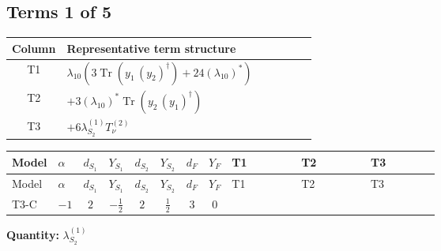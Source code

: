 \documentclass[8pt]{article}
\begin{document}
\begin{landscape}
\subsection*{Terms 1 of 5}
\begin{center}
\begin{tabular}{@{}c >{\raggedright\arraybackslash}p{0.82\linewidth}@{}}
\toprule
Column & Representative term structure \\
\midrule
T1 & \(\displaystyle {\lambda_{10}} (3 \operatorname{Tr}\!\left({y_1}\,\left({y_2}\right)^{\dagger}\right)+24 \left({\lambda_{10}}\right)^{*})\) \\
\midrule
T2 & \(\displaystyle +3 \left({\lambda_{10}}\right)^{*} \operatorname{Tr}\!\left({y_2}\,\left({y_1}\right)^{\dagger}\right)\) \\
\midrule
T3 & \(\displaystyle +6 {\lambda_{S_2}^{(1)}} T_{\nu}^{(2)}\) \\
\midrule
\bottomrule
\end{tabular}
\end{center}
\smallskip
\tiny
\begin{longtable}{@{}llcccccc >{\raggedright\arraybackslash}p{0.21\linewidth} >{\raggedright\arraybackslash}p{0.21\linewidth} >{\raggedright\arraybackslash}p{0.21\linewidth}@{}}
\toprule
Model & $\alpha$ & $d_{S_1}$ & $Y_{S_1}$ & $d_{S_2}$ & $Y_{S_2}$ & $d_F$ & $Y_F$ & T1 & T2 & T3 \\
\midrule
\endfirsthead
\toprule
Model & $\alpha$ & $d_{S_1}$ & $Y_{S_1}$ & $d_{S_2}$ & $Y_{S_2}$ & $d_F$ & $Y_F$ & T1 & T2 & T3 \\
\midrule
\endhead
T3-C & $-1$ & $2$ & $-\frac{1}{2}$ & $2$ & $\frac{1}{2}$ & $3$ & $0$ & \scriptsize\adjustbox{max width=\linewidth}{$\begin{gathered} {\lambda_{10}} (3 \operatorname{Tr}\!\left({y_1}\,\left({y_2}\right)^{\dagger}\right)+24 \left({\lambda_{10}}\right)^{*})\end{gathered}$} & \scriptsize\adjustbox{max width=\linewidth}{$\begin{gathered} +3 \left({\lambda_{10}}\right)^{*} \operatorname{Tr}\!\left({y_2}\,\left({y_1}\right)^{\dagger}\right)\end{gathered}$} & \scriptsize\adjustbox{max width=\linewidth}{$\begin{gathered} +6 {\lambda_{S_2}^{(1)}} T_{\nu}^{(2)}\end{gathered}$} \\
\midrule
\bottomrule
\end{longtable}
\clearpage
\noindent\textbf{Quantity: }$\lambda_{S_2}^{(1)}$\par\smallskip

\end{landscape}
\end{document}

